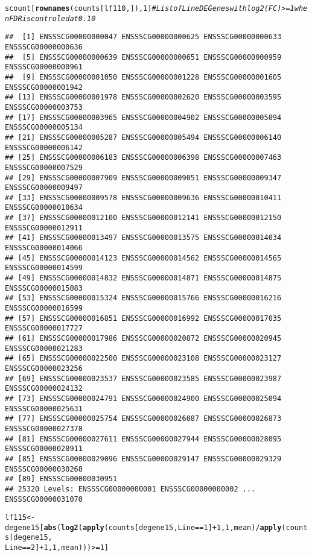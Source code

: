 \documentclass{article}\usepackage[]{graphicx}\usepackage[]{color}
\makeatletter
\newcommand{\hlnum}[1]{\textcolor[rgb]{0.686,0.059,0.569}{#1}}%
\newcommand{\hlcom}[1]{\textcolor[rgb]{0.678,0.584,0.686}{\textit{#1}}}%
\newcommand{\hlopt}[1]{\textcolor[rgb]{0,0,0}{#1}}%
\newcommand{\hlstd}[1]{\textcolor[rgb]{0.345,0.345,0.345}{#1}}%
\newcommand{\hlkwb}[1]{\textcolor[rgb]{0.69,0.353,0.396}{#1}}%
\newcommand{\hlkwd}[1]{\textcolor[rgb]{0.737,0.353,0.396}{\textbf{#1}}}%
\newenvironment{kframe}{%
 \def\at@end@of@kframe{}%
 \ifinner\ifhmode%
  \def\at@end@of@kframe{\end{minipage}}%
  \begin{minipage}{\columnwidth}%
 \fi\fi%
 \def\FrameCommand##1{\hskip\@totalleftmargin \hskip-\fboxsep
 \colorbox{shadecolor}{##1}\hskip-\fboxsep
     \hskip-\linewidth \hskip-\@totalleftmargin \hskip\columnwidth}%
 \MakeFramed {\advance\hsize-\width
   \@totalleftmargin\z@ \linewidth\hsize
   \@setminipage}}%
 {\par\unskip\endMakeFramed%
 \at@end@of@kframe}
\newenvironment{knitrout}{}{} %
\makeatother
\begin{document}
\begin{knitrout}
\begin{kframe}
\begin{alltt}
\hlstd{scount[}\hlkwd{rownames}\hlstd{(counts[lf110, ]),} \hlnum{1}\hlstd{]}  \hlcom{# List of  Line DE Genes with log2(FC) >=1 when FDR is controled at 0.10}
\end{alltt}
\begin{verbatim}
##  [1] ENSSSCG00000000047 ENSSSCG00000000625 ENSSSCG00000000633 ENSSSCG00000000636
##  [5] ENSSSCG00000000639 ENSSSCG00000000651 ENSSSCG00000000959 ENSSSCG00000000961
##  [9] ENSSSCG00000001050 ENSSSCG00000001228 ENSSSCG00000001605 ENSSSCG00000001942
## [13] ENSSSCG00000001978 ENSSSCG00000002620 ENSSSCG00000003595 ENSSSCG00000003753
## [17] ENSSSCG00000003965 ENSSSCG00000004902 ENSSSCG00000005094 ENSSSCG00000005134
## [21] ENSSSCG00000005287 ENSSSCG00000005494 ENSSSCG00000006140 ENSSSCG00000006142
## [25] ENSSSCG00000006183 ENSSSCG00000006398 ENSSSCG00000007463 ENSSSCG00000007529
## [29] ENSSSCG00000007909 ENSSSCG00000009051 ENSSSCG00000009347 ENSSSCG00000009497
## [33] ENSSSCG00000009578 ENSSSCG00000009636 ENSSSCG00000010411 ENSSSCG00000010634
## [37] ENSSSCG00000012100 ENSSSCG00000012141 ENSSSCG00000012150 ENSSSCG00000012911
## [41] ENSSSCG00000013497 ENSSSCG00000013575 ENSSSCG00000014034 ENSSSCG00000014066
## [45] ENSSSCG00000014123 ENSSSCG00000014562 ENSSSCG00000014565 ENSSSCG00000014599
## [49] ENSSSCG00000014832 ENSSSCG00000014871 ENSSSCG00000014875 ENSSSCG00000015083
## [53] ENSSSCG00000015324 ENSSSCG00000015766 ENSSSCG00000016216 ENSSSCG00000016599
## [57] ENSSSCG00000016851 ENSSSCG00000016992 ENSSSCG00000017035 ENSSSCG00000017727
## [61] ENSSSCG00000017986 ENSSSCG00000020872 ENSSSCG00000020945 ENSSSCG00000021283
## [65] ENSSSCG00000022500 ENSSSCG00000023108 ENSSSCG00000023127 ENSSSCG00000023256
## [69] ENSSSCG00000023537 ENSSSCG00000023585 ENSSSCG00000023987 ENSSSCG00000024132
## [73] ENSSSCG00000024791 ENSSSCG00000024900 ENSSSCG00000025094 ENSSSCG00000025631
## [77] ENSSSCG00000025754 ENSSSCG00000026087 ENSSSCG00000026873 ENSSSCG00000027378
## [81] ENSSSCG00000027611 ENSSSCG00000027944 ENSSSCG00000028095 ENSSSCG00000028911
## [85] ENSSSCG00000029096 ENSSSCG00000029147 ENSSSCG00000029329 ENSSSCG00000030268
## [89] ENSSSCG00000030951
## 25320 Levels: ENSSSCG00000000001 ENSSSCG00000000002 ... ENSSSCG00000031070
\end{verbatim}
\begin{alltt}
\hlstd{lf115} \hlkwb{<-} \hlstd{degene15[}\hlkwd{abs}\hlstd{(}\hlkwd{log2}\hlstd{(}\hlkwd{apply}\hlstd{(counts[degene15, Line} \hlopt{==} \hlnum{1}\hlstd{]} \hlopt{+} \hlnum{1}\hlstd{,} \hlnum{1}\hlstd{, mean)}\hlopt{/}\hlkwd{apply}\hlstd{(counts[degene15,}
    \hlstd{Line} \hlopt{==} \hlnum{2}\hlstd{]} \hlopt{+} \hlnum{1}\hlstd{,} \hlnum{1}\hlstd{, mean)))} \hlopt{>=} \hlnum{1}\hlstd{]}

\end{alltt}
\end{kframe}
\end{knitrout}
\end{document}
